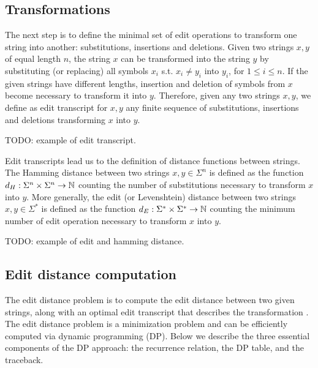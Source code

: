 \subsection{Transformations}

The next step is to define the minimal set of edit operations to transform one string into another: substitutions, insertions and deletions.
Given two strings $x,y$ of equal length $n$, the string $x$ can be transformed into the string $y$ by substituting (or replacing) all symbols $x_i$ s.t. $x_i \neq y_i$ into $y_i$, for $1 \leq i \leq n$.
If the given strings have different lengths, insertion and deletion of symbols from $x$ become necessary to transform it into $y$.
Therefore, given any two strings $x,y$, we define as edit transcript for $x,y$ any finite sequence of substitutions, insertions and deletions transforming $x$ into $y$.

\begin{example}
TODO: example of edit transcript.
\end{example}

Edit transcripts lead us to the definition of distance functions between strings.
The Hamming distance between two strings $x,y \in \Sigma^{n}$ is defined as the function $d_H : \Sigma^{n} \times \Sigma^{n} \rightarrow \mathbb {N}$ counting the number of substitutions necessary to transform $x$ into $y$.
More generally, the edit (or Levenshtein) distance between two strings $x,y \in \Sigma^{*}$ is defined as the function $d_E : \Sigma^{*} \times \Sigma^{*} \rightarrow \mathbb {N}$ counting the minimum number of edit operation necessary to transform $x$ into $y$.

\begin{example}
TODO: example of edit and hamming distance.
\end{example}

\subsection{Edit distance computation}

The edit distance problem is to compute the edit distance between two given strings, along with an optimal edit transcript that describes the transformation \cite{Gusfield1997}.
The edit distance problem is a minimization problem and can be efficiently computed via dynamic programming (DP). Below we describe the three essential components of the DP approach: the recurrence relation, the DP table, and the traceback.

